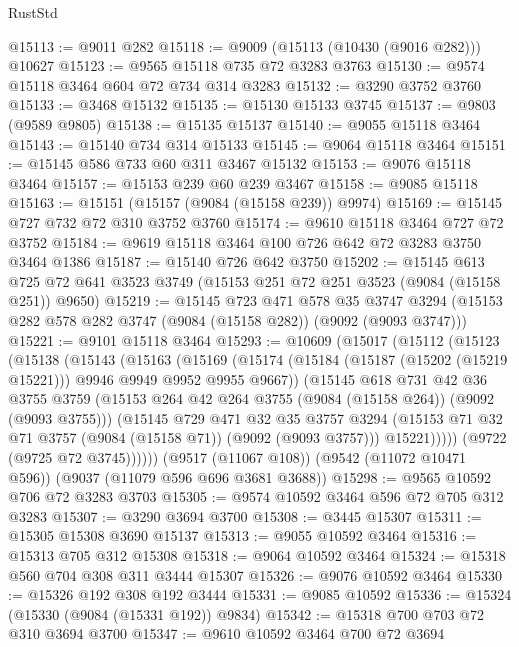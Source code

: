 \begin{lexlean}{RustStd}
\begin{coremodule}
@15113 := @9011 @282
@15118 := @9009 (@15113 (@10430 (@9016 @282))) @10627
@15123 := @9565 @15118 @735 @72 @3283 @3763
@15130 := @9574 @15118 @3464 @604 @72 @734 @314 @3283
@15132 := @3290 @3752 @3760
@15133 := @3468 @15132
@15135 := @15130 @15133 @3745
@15137 := @9803 (@9589 @9805)
@15138 := @15135 @15137
@15140 := @9055 @15118 @3464
@15143 := @15140 @734 @314 @15133
@15145 := @9064 @15118 @3464
@15151 := @15145 @586 @733 @60 @311 @3467 @15132
@15153 := @9076 @15118 @3464
@15157 := @15153 @239 @60 @239 @3467
@15158 := @9085 @15118
@15163 := @15151 (@15157 (@9084 (@15158 @239)) @9974)
@15169 := @15145 @727 @732 @72 @310 @3752 @3760
@15174 := @9610 @15118 @3464 @727 @72 @3752
@15184 := @9619 @15118 @3464 @100 @726 @642 @72 @3283 @3750 @3464 @1386
@15187 := @15140 @726 @642 @3750
@15202 := @15145
    @613
    @725
    @72
    @641
    @3523
    @3749
    (@15153 @251 @72 @251 @3523 (@9084 (@15158 @251)) @9650)
@15219 := @15145
    @723
    @471
    @578
    @35
    @3747
    @3294
    (@15153 @282 @578 @282 @3747 (@9084 (@15158 @282)) (@9092 (@9093 @3747)))
@15221 := @9101 @15118 @3464
@15293 := @10609
    (@15017
      (@15112
        (@15123
          (@15138
            (@15143
              (@15163
                (@15169
                  (@15174 (@15184 (@15187 (@15202 (@15219 @15221))) @9946 @9949 @9952 @9955 @9667))
                  (@15145
                    @618
                    @731
                    @42
                    @36
                    @3755
                    @3759
                    (@15153 @264 @42 @264 @3755 (@9084 (@15158 @264)) (@9092 (@9093 @3755)))
                    (@15145
                      @729
                      @471
                      @32
                      @35
                      @3757
                      @3294
                      (@15153 @71 @32 @71 @3757 (@9084 (@15158 @71)) (@9092 (@9093 @3757)))
                      @15221)))))
            (@9722 (@9725 @72 @3745))))))
    (@9517 (@11067 @108))
    (@9542 (@11072 @10471 @596))
    (@9037 (@11079 @596 @696 @3681 @3688))
@15298 := @9565 @10592 @706 @72 @3283 @3703
@15305 := @9574 @10592 @3464 @596 @72 @705 @312 @3283
@15307 := @3290 @3694 @3700
@15308 := @3445 @15307
@15311 := @15305 @15308 @3690 @15137
@15313 := @9055 @10592 @3464
@15316 := @15313 @705 @312 @15308
@15318 := @9064 @10592 @3464
@15324 := @15318 @560 @704 @308 @311 @3444 @15307
@15326 := @9076 @10592 @3464
@15330 := @15326 @192 @308 @192 @3444
@15331 := @9085 @10592
@15336 := @15324 (@15330 (@9084 (@15331 @192)) @9834)
@15342 := @15318 @700 @703 @72 @310 @3694 @3700
@15347 := @9610 @10592 @3464 @700 @72 @3694

\end{coremodule}
\end{lexlean}
